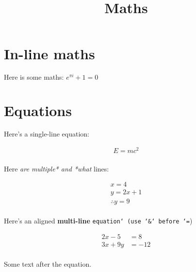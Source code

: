\documentclass[10pt]{extarticle}
\title{\textbf{Maths}}
\date{}
\begin{document}

\maketitle{}

\section{In-line maths}

Here is some maths: $e^{\pi i} + 1 = 0$

\section{Equations}

Here's a single-line equation:

\begin{align*}
E = mc^2 \\
\end{align*}

Here \textit{are multiple* and *what} lines:

\begin{align*}
x = 4 \\
y = 2x + 1 \\
\therefore y = 9 \\
\end{align*}

Here's an aligned \textbf{multi-line} \texttt{equation` (use `\&` before `=})

\begin{align*}
2x - 5 &= 8 \\
3x + 9y &= -12 \\
\end{align*}

Some text after the equation.

\end{document}
